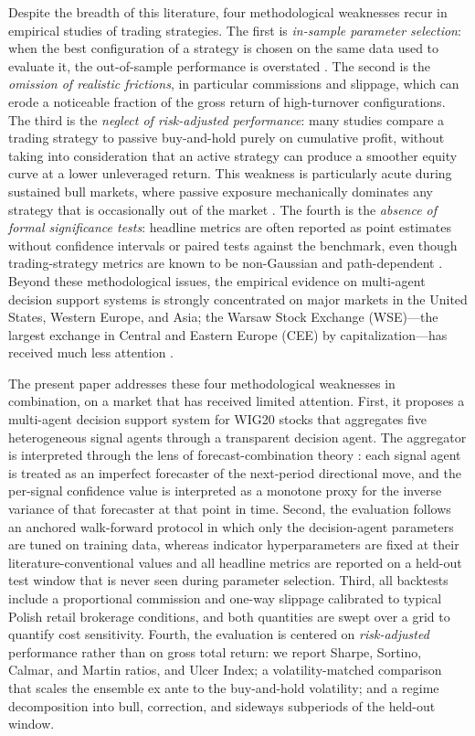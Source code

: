 \documentclass{ieeeaccess}
\begin{document}
Despite the breadth of this literature, four methodological weaknesses recur in empirical studies of trading strategies. The first is \emph{in-sample parameter selection}: when the best configuration of a strategy is chosen on the same data used to evaluate it, the out-of-sample performance is overstated \cite{bailey2014,harvey2016}. The second is the \emph{omission of realistic frictions}, in particular commissions and slippage, which can erode a noticeable fraction of the gross return of high-turnover configurations. The third is the \emph{neglect of risk-adjusted performance}: many studies compare a trading strategy to passive buy-and-hold purely on cumulative profit, without taking into consideration that an active strategy can produce a smoother equity curve at a lower unleveraged return. This weakness is particularly acute during sustained bull markets, where passive exposure mechanically dominates any strategy that is occasionally out of the market \cite{dichtl2020}. The fourth is the \emph{absence of formal significance tests}: headline metrics are often reported as point estimates without confidence intervals or paired tests against the benchmark, even though trading-strategy metrics are known to be non-Gaussian and path-dependent \cite{politis1994,bailey2014}. Beyond these methodological issues, the empirical evidence on multi-agent decision support systems is strongly concentrated on major markets in the United States, Western Europe, and Asia; the Warsaw Stock Exchange (WSE)---the largest exchange in Central and Eastern Europe (CEE) by capitalization---has received much less attention \cite{czapkiewicz2015,jagric2015,buczynski2021}.

The present paper addresses these four methodological weaknesses in combination, on a market that has received limited attention. First, it proposes a multi-agent decision support system for WIG20 stocks that aggregates five heterogeneous signal agents through a transparent decision agent. The aggregator is interpreted through the lens of forecast-combination theory \cite{batesgranger1969,clemen1989,timmermann2006}: each signal agent is treated as an imperfect forecaster of the next-period directional move, and the per-signal confidence value is interpreted as a monotone proxy for the inverse variance of that forecaster at that point in time. Second, the evaluation follows an anchored walk-forward protocol in which only the decision-agent parameters are tuned on training data, whereas indicator hyperparameters are fixed at their literature-conventional values and all headline metrics are reported on a held-out test window that is never seen during parameter selection. Third, all backtests include a proportional commission and one-way slippage calibrated to typical Polish retail brokerage conditions, and both quantities are swept over a grid to quantify cost sensitivity. Fourth, the evaluation is centered on \emph{risk-adjusted} performance rather than on gross total return: we report Sharpe, Sortino, Calmar, and Martin ratios, and Ulcer Index; a volatility-matched comparison that scales the ensemble ex ante to the buy-and-hold volatility; and a regime decomposition into bull, correction, and sideways subperiods of the held-out window.
\end{document}
